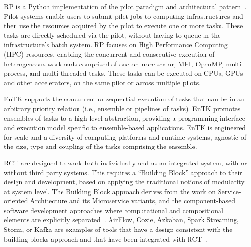 \documentclass[preprint,12pt, a4paper]{elsarticle}
\begin{document}
RP is a Python implementation of the pilot paradigm and architectural
pattern~\cite{turilli2018comprehensive}. Pilot systems enable users to submit
pilot jobs to computing infrastructures and then use the resources acquired
by the pilot to execute one or more tasks. These tasks are directly scheduled
via the pilot, without having to queue in the infrastructure's batch system.
RP focuses on High Performance Computing (HPC) resources, enabling the
concurrent and consecutive execution of heterogeneous workloads comprised of
one or more scalar, MPI, OpenMP, multi-process, and multi-threaded tasks.
These tasks can be executed on CPUs, GPUs and other accelerators, on the same
pilot or across multiple pilots.

EnTK supports the concurrent or sequential execution of tasks that can be in
an arbitrary priority relation (i.e., ensemble or pipelines of tasks). EnTK
promotes ensembles of tasks to a high-level abstraction, providing a
programming interface and execution model specific to ensemble-based
applications. EnTK is engineered for scale and a diversity of computing
platforms and runtime systems, agnostic of the size, type and coupling of the
tasks comprising the ensemble.

RCT are designed to work both individually and as an integrated system, with
or without third party systems. This requires a ``Building Block'' approach
to their design and development, based on applying the traditional notions of
modularity at system level. The Building Block approach derives from the work
on Service-oriented Architecture and its Microservice variants, and the
component-based software development approaches where computational and
compositional elements are explicitly
separated~\cite{batory1992design,garlan1995architectural,lenz1988software,clemens1998component,schneider2000components}.
AirFlow, Oozie, Azkaban, Spark Streaming, Storm, or Kafka are examples of
tools that have a design consistent with the building blocks approach and
that have been integrated with RCT~\cite{}.

\end{document}
